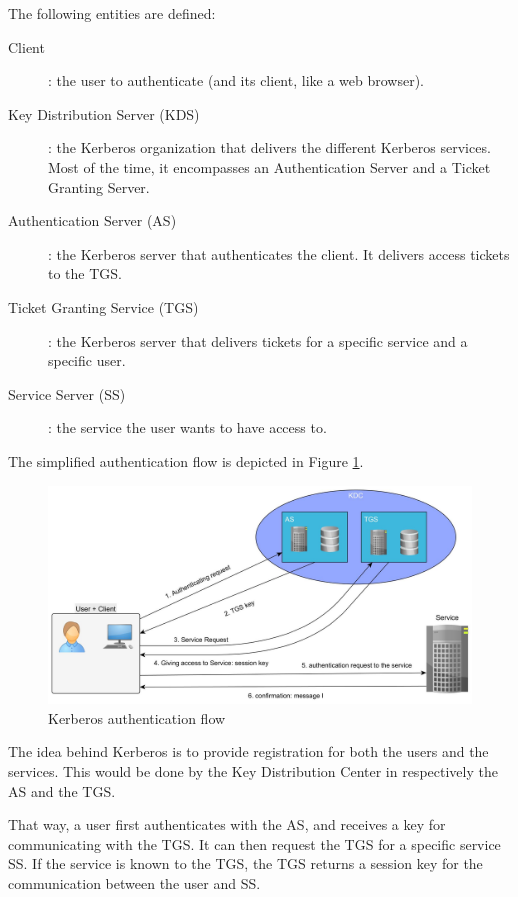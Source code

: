 The following entities are defined:
\begin{description}
	\item[Client]: the user to authenticate (and its client, like a web browser).
	\item[Key Distribution Server (KDS)]: the Kerberos organization that delivers the different Kerberos services. Most of the time, it encompasses an Authentication Server and a Ticket Granting Server.
	\item[Authentication Server (AS)]: the Kerberos server that authenticates the client. It delivers access tickets to the TGS.
	\item[Ticket Granting Service (TGS)]: the Kerberos server that delivers tickets for a specific service and a specific user.
	\item[Service Server (SS)]: the service the user wants to have access to. 
\end{description}

The simplified authentication flow is depicted in Figure \ref{fig:kerberos_simple}.

\begin{figure}[!ht]
	\centering
	\caption{Kerberos authentication flow}
	\label{fig:kerberos_simple}
	\includegraphics[width=1\textwidth]{images/kerberos_simple}
\end{figure}

The idea behind Kerberos is to provide registration for both the users and the services. This would be done by the Key Distribution Center in respectively the AS and the TGS.

That way, a user first authenticates with the AS, and receives a key for communicating with the TGS. It can then request the TGS for a specific service SS. If the service is known to the TGS, the TGS returns a session key for the communication between the user and SS. 

